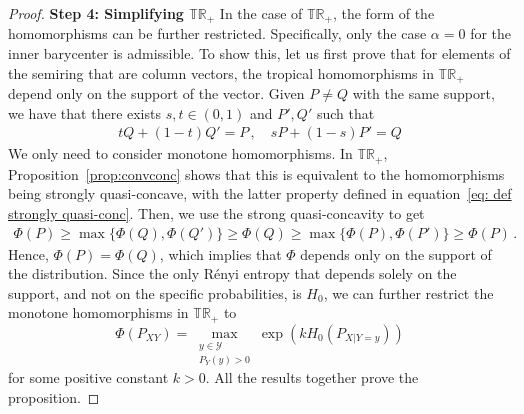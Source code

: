 \documentclass[aps,pra,11pt,onecolumn,nofootinbib,tightenlines]{revtex4-2}
\newtheorem{proposition}[theorem]{Proposition}
\theoremstyle{definition}
\begin{document}
\begin{proof}
\noindent \textbf{Step 4: Simplifying $\mathbb{TR}_+$} In the case of $\mathbb{TR}_+$, the form of the homomorphisms can be further restricted. Specifically, only the case $\alpha = 0$ for the inner barycenter is admissible. To show this, let us first prove that for elements of the semiring that are column vectors, the tropical homomorphisms in $\mathbb{TR}_+$ depend only on the support of the vector. Given $P\neq Q$ with the same support, we have that there exists $s,t \in (0,1)$ and $P',Q'$ such that
\begin{align}
   tQ+(1-t)Q'=P\,, \quad  sP+(1-s)P'=Q
\end{align}
We only need to consider monotone homomorphisms. In \(\mathbb{TR}_+\), Proposition~\ref{prop:convconc} shows that this is equivalent to the homomorphisms being strongly quasi-concave, with the latter property defined in equation~\eqref{eq: def strongly quasi-conc}.
Then, we use the strong quasi-concavity to get
\begin{align}
    \Phi(P) \geq \max \{\Phi(Q),\Phi(Q')\} \geq \Phi(Q) \geq \max \{\Phi(P),\Phi(P')\} \geq \Phi(P) \,.
\end{align}
Hence, $\Phi(P) = \Phi(Q)$, which implies that $\Phi$ depends only on the support of the distribution. Since the only Rényi entropy that depends solely on the support, and not on the specific probabilities, is $H_0$, we can further restrict the monotone homomorphisms in $\mathbb{TR}_+$ to
\begin{equation}
    \Phi(P_{XY}) = \max \limits_{\substack{y \in \mathcal{Y} \\ P_Y( y) > 0}}
    \exp(kH_0(P_{X|Y=y}))
\end{equation}
for some positive constant $k>0$.
All the results together prove the proposition.
\end{proof}


\end{document}
